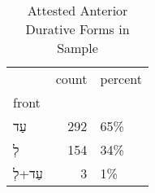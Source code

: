 \begin{table}[htbp!]
\centering
\caption{Attested Anterior Durative Forms in Sample}
\label{table:antdur_front}
\begin{tabular}{lrl}
\toprule
{} &  count & percent \\
front               &        &         \\
\midrule
\texthebrew{עַד}    &    292 &     65\% \\
\texthebrew{לְ}     &    154 &     34\% \\
\texthebrew{עַד+לְ} &      3 &      1\% \\
\bottomrule
\end{tabular}
\end{table}
